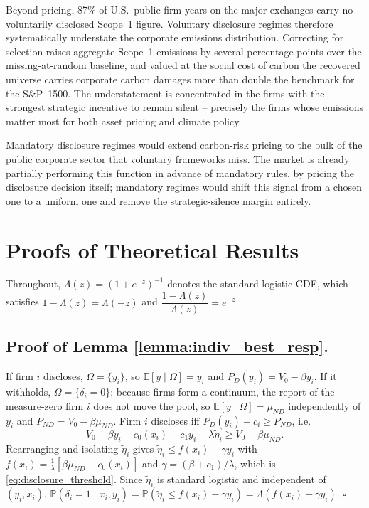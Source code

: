 \documentclass[a4paper,12pt]{article}
\newcommand{\citet}[1]{\textcite{#1}}
\begin{document}
Beyond pricing, 87\% of U.S.\ public firm-years on the major exchanges carry no voluntarily disclosed Scope~1 figure. Voluntary disclosure regimes therefore systematically understate the corporate emissions distribution. Correcting for selection raises aggregate Scope~1 emissions by several percentage points over the missing-at-random baseline, and valued at the social cost of carbon the recovered universe carries corporate carbon damages more than double the \citet{greenstone2023mandatory} benchmark for the S\&P~1500. The understatement is concentrated in the firms with the strongest strategic incentive to remain silent --  precisely the firms whose emissions matter most for both asset pricing and climate policy.

Mandatory disclosure regimes would extend carbon-risk pricing to the bulk of the public corporate sector that voluntary frameworks miss. The market is already partially performing this function in advance of mandatory rules, by pricing the disclosure decision itself; mandatory regimes would shift this signal from a chosen one to a uniform one and remove the strategic-silence margin entirely.

\clearpage
\printbibliography

\clearpage
\appendix
\renewcommand{\thefigure}{A\arabic{figure}}
\renewcommand{\thetable}{A\arabic{table}}
\setcounter{figure}{0}
\setcounter{table}{0}

\section{Proofs of Theoretical Results}
\label{app:proofs}

Throughout, $\Lambda(z) = (1+e^{-z})^{-1}$ denotes the standard logistic CDF, which satisfies $1-\Lambda(z) = \Lambda(-z)$ and $\dfrac{1-\Lambda(z)}{\Lambda(z)} = e^{-z}$.

\subsection{Proof of Lemma \ref{lemma:indiv_best_resp}.}
If firm $i$ discloses, $\Omega = \{y_i\}$, so $\mathbb{E}[y \mid \Omega] = y_i$ and $P_D(y_i) = V_0 - \beta y_i$. If it withholds, $\Omega = \{\delta_i = 0\}$; because firms form a continuum, the report of the measure-zero firm $i$ does not move the pool, so $\mathbb{E}[y \mid \Omega] = \mu_{ND}$ independently of $y_i$ and $P_{ND} = V_0 - \beta \mu_{ND}$. Firm $i$ discloses iff $P_D(y_i) - \tilde{c}_i \geq P_{ND}$, i.e.
\begin{equation*}
    V_0 - \beta y_i - c_0(x_i) - c_1 y_i - \lambda \tilde{\eta}_i \geq V_0 - \beta \mu_{ND}.
\end{equation*}
Rearranging and isolating $\tilde{\eta}_i$ gives $\tilde{\eta}_i \leq f(x_i) - \gamma y_i$ with $f(x_i) = \tfrac{1}{\lambda}[\beta \mu_{ND} - c_0(x_i)]$ and $\gamma = (\beta+c_1)/\lambda$, which is \eqref{eq:disclosure_threshold}. Since $\tilde{\eta}_i$ is standard logistic and independent of $(y_i, x_i)$, $\mathbb{P}(\delta_i = 1 \mid x_i, y_i) = \mathbb{P}(\tilde{\eta}_i \leq f(x_i) - \gamma y_i) = \Lambda(f(x_i) - \gamma y_i)$. \hfill $\square$
\end{document}
